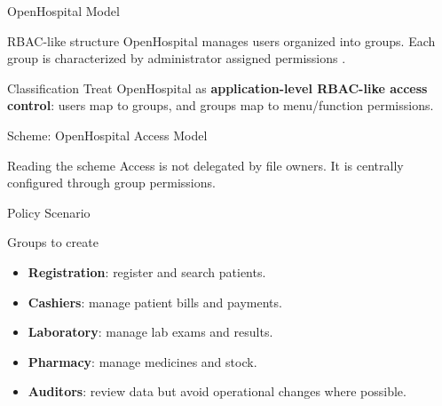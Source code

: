 \documentclass[presentation]{beamer}
\begin{document}
\begin{frame}[c]{OpenHospital Model}
\begin{block}{RBAC-like structure}
OpenHospital manages users organized into groups. Each group is characterized by administrator
assigned permissions \cite{openhospital_user}.
\end{block}

\begin{exampleblock}{Classification}
Treat OpenHospital as \textbf{application-level RBAC-like access control}: users
map to groups, and groups map to menu/function permissions.
\end{exampleblock}
\end{frame}

\begin{frame}[c]{Scheme: OpenHospital Access Model}
\begin{center}
\end{center}

\begin{block}{Reading the scheme}
Access is not delegated by file owners. It is centrally configured through group permissions.
\end{block}
\end{frame}

\begin{frame}[c]{Policy Scenario}
\begin{block}{Groups to create}
\begin{itemize}
    \item \textbf{Registration}: register and search patients.
    \item \textbf{Cashiers}: manage patient bills and payments.
    \item \textbf{Laboratory}: manage lab exams and results.
    \item \textbf{Pharmacy}: manage medicines and stock.
    \item \textbf{Auditors}: review data but avoid operational changes where possible.
\end{itemize}
\end{block}
\end{frame}
\end{document}
